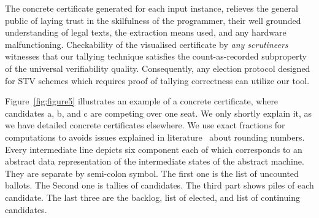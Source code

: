 \documentclass{llncs}
\begin{document}
The concrete certificate generated for each input instance, relieves the general public of laying trust in the skilfulness of the programmer, their  well grounded understanding of legal texts, the extraction means used, and any hardware malfunctioning. 
Checkability of the visualised certificate by \emph{any scrutineers} witnesses that our tallying technique satisfies the count-as-recorded subproperty of the universal verifiability quality. Consequently, any election protocol designed for STV schemes which requires proof of tallying correctness can utilize our tool.

 Figure~\ref{fig;figure5} illustrates an example of a concrete certificate, where candidates a, b, and c are competing over one seat. We only shortly explain it, as we have detailed concrete certificates elsewhere\cite{}.  We use exact fractions for computations to avoids issues explained in literature~\cite{DBLP:conf/voteid/GoreL16} about rounding numbers. Every intermediate line depicts six component each of which corresponds to an abstract data representation of the intermediate states of the abstract  machine. They are separate by semi-colon symbol.  The first one is the list of uncounted ballots. The Second one is tallies of candidates. The third part shows piles of each candidate. The last three are the backlog, list of elected, and list of continuing candidates. 
 
\end{document}
